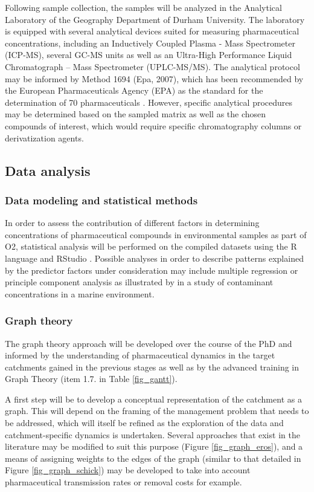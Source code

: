 \documentclass{article}
\begin{document}
Following sample collection, the samples will be analyzed in the Analytical Laboratory of the Geography Department of Durham University. The laboratory is equipped with several analytical devices suited for measuring pharmaceutical concentrations, including an Inductively Coupled Plasma - Mass Spectrometer (ICP-MS), several GC-MS units as well as an Ultra-High Performance Liquid Chromatograph – Mass Spectrometer (UPLC-MS/MS). The analytical protocol may be informed by Method 1694 (Epa, 2007), which has been recommended by the European Pharmaceuticals Agency (EPA) as the standard for the determination of 70 pharmaceuticals \citep{Caban2015AnalyticalProspects}. However, specific analytical procedures may be determined based on the sampled matrix as well as the chosen compounds of interest, which would require specific chromatography columns or derivatization agents.

\subsection{Data analysis}
\subsubsection{Data modeling and statistical methods}
In order to assess the contribution of different factors in determining concentrations of pharmaceutical compounds in environmental samples as part of O2, statistical analysis will be performed on the compiled datasets using the R language and RStudio \citep{R.Development.CoreTeam2010R:Computing.}. Possible analyses in order to describe patterns explained by the predictor factors under consideration may include multiple regression or principle component analysis as illustrated by \citet{Giglioli2020SourceNaples} in a study of contaminant concentrations in a marine environment.

\subsubsection{Graph theory}
The graph theory approach will be developed over the course of the PhD and informed by the understanding of pharmaceutical dynamics in the target catchments gained in the previous stages as well as by the advanced training in Graph Theory (item 1.7. in Table \ref{fig_gantt}). 

A first step will be to develop a conceptual representation of the catchment as a graph. This will depend on the framing of the management problem that needs to be addressed, which will itself be refined as the exploration of the data and catchment-specific dynamics is undertaken. Several approaches that exist in the literature may be modified to suit this purpose (Figure \ref{fig_graph_eros}), and a means of assigning weights to the edges of the graph (similar to that detailed in Figure \ref{fig_graph_schick}) may be developed to take into account pharmaceutical transmission rates or removal costs for example.
\end{document}
